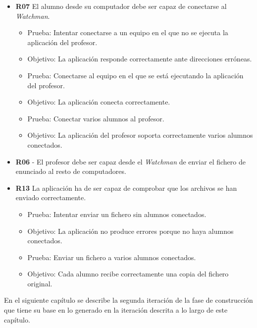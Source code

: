 \begin{itemize}


    \item {\bfseries R07} El alumno desde su computador debe ser capaz de conectarse al \emph{Watchman}.

    \begin{itemize}
        \item Prueba: Intentar conectarse a un equipo en el que no se ejecuta la aplicación del profesor.
        \item Objetivo: La aplicación responde correctamente ante direcciones erróneas.
        \newline
        
        \item Prueba: Conectarse al equipo en el que se está ejecutando la aplicación del profesor.
        \item Objetivo: La aplicación conecta correctamente.
        \newline
        
        \item Prueba: Conectar varios alumnos al profesor.
        \item Objetivo: La aplicación del profesor soporta correctamente varios alumnos conectados.
        
    \end{itemize}

    \item {\bfseries R06} -  El profesor debe ser capaz desde el \emph{Watchman} de enviar el fichero de enunciado al resto de computadores.

    \item  {\bfseries R13} La aplicación ha de ser capaz de comprobar que los archivos se han enviado correctamente.

    \begin{itemize}

        \item Prueba: Intentar enviar un fichero sin alumnos conectados.
        \item Objetivo: La aplicación no produce errores porque no haya alumnos conectados.
        \newline
        
        \item Prueba: Enviar un fichero a varios alumnos conectados.
        \item Objetivo: Cada alumno recibe correctamente una copia del fichero original.

    \end{itemize}

\end{itemize}


En el siguiente capítulo se describe la segunda iteración de la fase de construcción que tiene su base en lo generado en la iteración descrita a lo largo de este capítulo.

